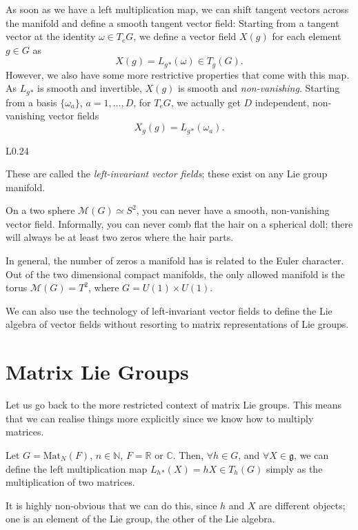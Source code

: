 As soon as we have a left multiplication map, we can shift tangent vectors across the manifold and define a smooth tangent vector field:
Starting from a tangent vector at the identity $\omega \in T_e G$, we define a vector field $X(g)$ for each element $g \in G$ as
\begin{equation}
  X(g) = L_g{}_*(\omega) \in T_g(G).
\end{equation}
However, we also have some more restrictive properties that come with this map. As $L_g{}_*$ is smooth and invertible, $X(g)$ is smooth and \emph{non-vanishing}.
Starting from a basis $\{\omega_a\}$, $a = 1, \dots, D$, for $T_eG$, we actually get $D$ independent, non-vanishing vector fields
\begin{equation}
  X_g(g) = L_g{}_* (\omega_a).
\end{equation}

\begin{wrapfigure}{L}{0.24\columnwidth}
  \centering
  \def\svgwidth{0.2\columnwidth}
  
  \caption{}
  \label{fig:hairyball}
\end{wrapfigure}

These are called the \emph{left-invariant vector fields}; these exist on any Lie group manifold.

\begin{example}
  On a two sphere $\mathcal{M}(G) \simeq S^2$, you can never have a smooth, non-vanishing vector field.
  Informally, you can never comb flat the hair on a spherical doll; there will always be at least two zeros where the hair parts.
\end{example}
In general, the number of zeros a manifold has is related to the Euler character.
Out of the two dimensional compact manifolds, the only allowed manifold is the torus $\mathcal{M}(G) = T^2$, where $G = U(1) \times U(1)$.

We can also use the technology of left-invariant vector fields to define the Lie algebra of vector fields without resorting to matrix representations of Lie groups.

\section{Matrix Lie Groups}%
\label{sec:matrix_lie_groups-again}

Let us go back to the more restricted context of matrix Lie groups. This means that we can realise things more explicitly since we know how to multiply matrices.
\begin{claim}
  Let $G = \text{Mat}_N(F)$, $n \in \mathbb{N}$, $F = \mathbb{R} \text{ or } \mathbb{C}$.
  Then, $\forall h \in G$, and $\forall X \in \mathfrak{g}$, we can define the left multiplication map $L_h{}_*(X) = h X \in T_h(G)$ simply as the multiplication of two matrices.
\end{claim}
\begin{leftbar}
  \begin{remark}
    It is highly non-obvious that we can do this, since $h$ and $X$ are different objects; one is an element of the Lie group, the other of the Lie algebra.
  \end{remark}
\end{leftbar}

